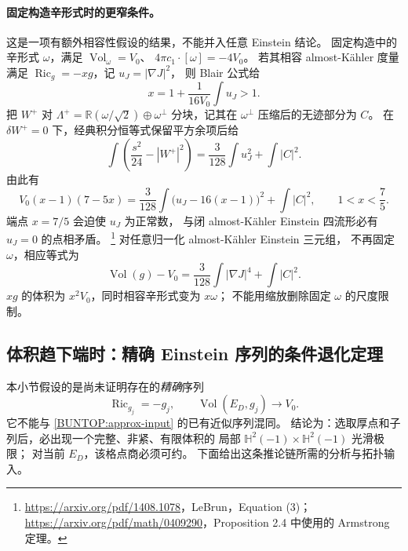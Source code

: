 \documentclass[UTF8,fontset=fandol,zihao=-4,oneside,openany]{ctexbook}
\theoremstyle{cjkplain}
\numberwithin{equation}{chapter}
\begin{document}
\paragraph{固定构造辛形式时的更窄条件。}
这是一项有额外相容性假设的结果，不能并入任意 Einstein 结论。
固定构造中的辛形式 \(\omega\)，满足
\(\operatorname{Vol}_\omega=V_0\)、
\(4\pi c_1\cdot[\omega]=-4V_0\)。
若其相容 almost-K\"ahler 度量满足
\(\operatorname{Ric}_g=-xg\)，记 \(u_J=|\nabla J|^2\)，
则 Blair 公式给
\[
 x=1+\frac{1}{16V_0}\int u_J>1.
\]
把 \(W^+\) 对
\(\Lambda^+=\mathbb R(\omega/\sqrt2)\oplus\omega^\perp\)
分块，记其在 \(\omega^\perp\) 压缩后的无迹部分为 \(C\)。
在 \(\delta W^+=0\) 下，经典积分恒等式保留平方余项后给
\begin{equation}
 \int\left(\frac{s^2}{24}-|W^+|^2\right)
 =\frac{3}{128}\int u_J^2+\int|C|^2.
 \label{BUNTOP:AK-remainder}
\end{equation}
由此有
\begin{equation}
 V_0(x-1)(7-5x)
 =\frac{3}{128}\int\bigl(u_J-16(x-1)\bigr)^2+\int|C|^2,
 \qquad 1<x<\frac75 .
 \label{BUNTOP:AK-scale}
\end{equation}
端点 \(x=7/5\) 会迫使 \(u_J\) 为正常数，
与闭 almost-K\"ahler Einstein 四流形必有 \(u_J=0\) 的点相矛盾。%
\footnote{\url{https://arxiv.org/pdf/1408.1078}，LeBrun，Equation (3)；
\url{https://arxiv.org/pdf/math/0409290}，Proposition 2.4 中使用的 Armstrong 定理。}
对任意归一化 almost-K\"ahler Einstein 三元组，
不再固定 \(\omega\)，相应等式为
\[
 \operatorname{Vol}(g)-V_0
 =\frac{3}{128}\int|\nabla J|^4+\int|C|^2 .
\]
\(xg\) 的体积为 \(x^2V_0\)，同时相容辛形式变为 \(x\omega\)；
不能用缩放删除固定 \(\omega\) 的尺度限制。

\subsection{体积趋下端时：精确 Einstein 序列的条件退化定理}
\label{BUNTOP:endpoint}

本小节假设的是尚未证明存在的\emph{精确}序列
\begin{equation}
 \operatorname{Ric}_{g_j}=-g_j,\qquad
 \operatorname{Vol}(E_D,g_j)\longrightarrow V_0 .
 \label{BUNTOP:exact-sequence-hypothesis}
\end{equation}
它不能与 \eqref{BUNTOP:approx-input} 的已有近似序列混同。
结论为：选取厚点和子列后，必出现一个完整、非紧、有限体积的
局部 \(\mathbb H^2(-1)\times\mathbb H^2(-1)\) 光滑极限；
对当前 \(E_D\)，该格点商必须可约。
下面给出这条推论链所需的分析与拓扑输入。
\end{document}
